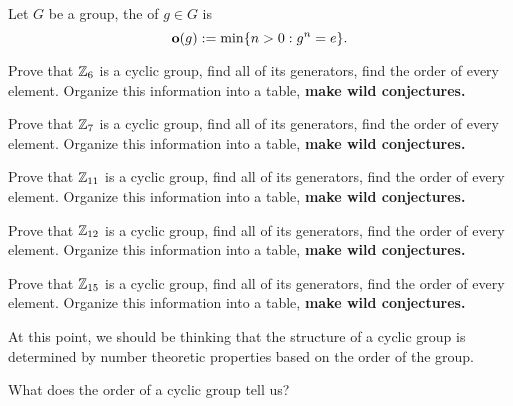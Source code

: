 \documentclass{ximera}
\begin{document}
\begin{definition}
  Let $G$ be a group, the  of $g\in G$ is
  \[
  \mathbf o(g) := \min\{n>0: g^n = e\}.
  \]
\end{definition}


\begin{exercise}
  Prove that $\mathbb Z_{6}$ is a cyclic group, find all of its generators,
  find the order of every element. Organize this information into a
  table, \textbf{make wild conjectures.}
\end{exercise}

\begin{exercise}
  Prove that $\mathbb Z_{7}$ is a cyclic group, find all of its generators,
  find the order of every element. Organize this information into a
  table, \textbf{make wild conjectures.}
\end{exercise}


\begin{exercise}
  Prove that $\mathbb Z_{11}$ is a cyclic group, find all of its generators,
  find the order of every element. Organize this information into a
  table, \textbf{make wild conjectures.}
\end{exercise}



\begin{exercise}
  Prove that $\mathbb Z_{12}$ is a cyclic group, find all of its generators,
  find the order of every element. Organize this information into a
  table, \textbf{make wild conjectures.}
\end{exercise}


\begin{exercise}
  Prove that $\mathbb Z_{15}$ is a cyclic group, find all of its generators,
  find the order of every element. Organize this information into a
  table, \textbf{make wild conjectures.}
\end{exercise}


At this point, we should be thinking that the structure of a cyclic
group is determined by number theoretic properties based on the order
of the group.


\begin{question}
  What does the order of a cyclic group tell us?
\end{question}
\end{document}
